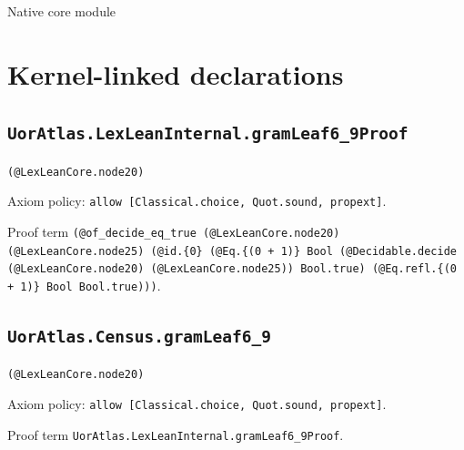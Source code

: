 \documentclass[11pt]{article}
\begin{document}
\begin{center}{\LARGE Native core module}\end{center}
\section*{Kernel-linked declarations}
\subsection*{\texttt{UorAtlas.LexLeanInternal.gramLeaf6\_9Proof}}
\noindent\texttt{(@LexLeanCore.node20)}\par
\noindent Axiom policy: \texttt{allow [Classical.choice, Quot.sound, propext]}.\par
\noindent Proof term \texttt{(@of\_decide\_eq\_true (@LexLeanCore.node20) (@LexLeanCore.node25) (@id.\{0\} (@Eq.\{(0 + 1)\} Bool (@Decidable.decide (@LexLeanCore.node20) (@LexLeanCore.node25)) Bool.true) (@Eq.refl.\{(0 + 1)\} Bool Bool.true)))}.\par
\subsection*{\texttt{UorAtlas.Census.gramLeaf6\_9}}
\noindent\texttt{(@LexLeanCore.node20)}\par
\noindent Axiom policy: \texttt{allow [Classical.choice, Quot.sound, propext]}.\par
\noindent Proof term \texttt{UorAtlas.LexLeanInternal.gramLeaf6\_9Proof}.\par
\end{document}
